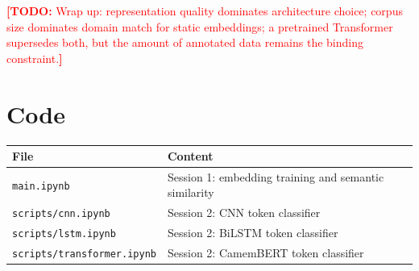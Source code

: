 \documentclass[11pt,a4paper]{article}
\newcommand{\TODO}[1]{\textcolor{red}{\textbf{[TODO:} #1\textbf{]}}}
\begin{document}
\TODO{Wrap up: representation quality dominates architecture choice; corpus size dominates
domain match for static embeddings; a pretrained Transformer supersedes both, but the amount of
annotated data remains the binding constraint.}

\appendix
\section{Code}
\label{sec:code}

\begin{tabular}{ll}
\toprule
File & Content \\
\midrule
\texttt{main.ipynb}            & Session 1: embedding training and semantic similarity \\
\texttt{scripts/cnn.ipynb}     & Session 2: CNN token classifier \\
\texttt{scripts/lstm.ipynb}    & Session 2: BiLSTM token classifier \\
\texttt{scripts/transformer.ipynb} & Session 2: CamemBERT token classifier \\
\bottomrule
\end{tabular}
\end{document}
